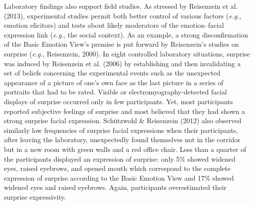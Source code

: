 \documentclass[
  english,
  doc]{apa7}
\begin{document}
Laboratory findings also support field studies. As stressed by Reisenzein et al. (2013), experimental studies permit both better control of various factors (\emph{e.g.}, emotion elicitors) and tests about likely moderators of the emotion--facial expression link (\emph{e.g.}, the social context). As an example, a strong disconfirmation of the Basic Emotion View's premise is put forward by Reisenzein's studies on surprise (\emph{e.g.}, Reisenzein, 2000). In eight controlled laboratory situations, surprise was induced by Reisenzein et al. (2006) by establishing and then invalidating a set of beliefs concerning the experimental events such as the unexpected appearance of a picture of one's own face as the last picture in a series of portraits that had to be rated. Visible or electromyography-detected facial displays of surprise occurred only in few participants. Yet, most participants reported subjective feelings of surprise and most believed that they had shown a strong surprise facial expression. Schützwohl \& Reisenzein (2012) also observed similarly low frequencies of surprise facial expressions when their participants, after leaving the laboratory, unexpectedly found themselves not in the corridor but in a new room with green walls and a red office chair. Less than a quarter of the participants displayed an expression of surprise: only 5\% showed widened eyes, raised eyebrows, and opened mouth which correspond to the complete expression of surprise according to the Basic Emotion View and 17\% showed widened eyes and raised eyebrows. Again, participants overestimated their surprise expressivity.
\end{document}
